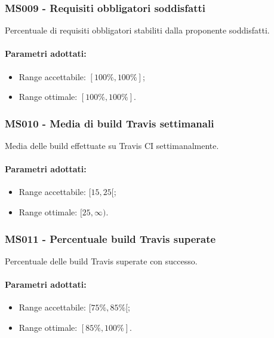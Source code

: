 \subsubsection{MS009 - Requisiti obbligatori soddisfatti}\mbox{}
Percentuale di requisiti obbligatori stabiliti dalla proponente soddisfatti.
\paragraph{Parametri adottati:}
\begin{itemize}
	\item Range accettabile: $[100\%,100\%]$;
	\item Range ottimale: $[100\%,100\%]$.
\end{itemize}
	
\subsubsection{MS010 - Media di build Travis settimanali}\mbox{}
Media delle build effettuate su Travis CI settimanalmente.
\paragraph{Parametri adottati:}
\begin{itemize}
	\item Range accettabile: $[15,25[$;
	\item Range ottimale: $[25,\infty)$.
\end{itemize}

\subsubsection{MS011 - Percentuale build Travis superate}\mbox{}
Percentuale delle build Travis superate con successo.
\paragraph{Parametri adottati:}
\begin{itemize}
	\item Range accettabile: $[75\%,85\%[$;
	\item Range ottimale: $[85\%,100\%]$.
\end{itemize}